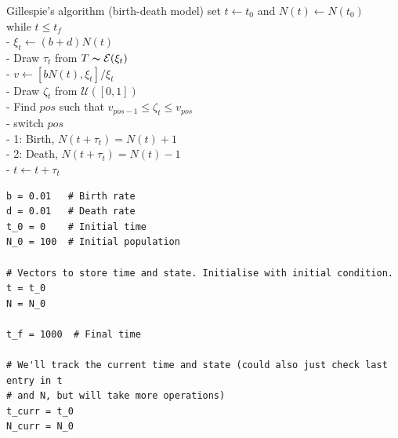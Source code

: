 \documentclass[aspectratio=169]{beamer}
\begin{document}
\begin{frame}{Gillespie's algorithm (birth-death model)}
set $t\leftarrow t_0$ and $N(t)\leftarrow N(t_0)$\\
while {$t\leq t_f$}\\
- $\xi_t\leftarrow (b+d)N(t)$\\
- Draw $\tau_t$ from $T\thicksim \mathcal{E}(\xi_t)$\\
- $v\leftarrow\left[bN(t),\xi_t\right]/\xi_t$\\
- Draw $\zeta_t$ from $\mathcal{U}([0,1])$\\
- Find $pos$ such that $v_{pos-1}\leq\zeta_t\leq v_{pos}$\\
- switch {$pos$}\\
\qquad - 1: Birth, $N(t+\tau_t)=N(t)+1$ \\
\qquad - 2: Death, $N(t+\tau_t)=N(t)-1$ \\
- $t\leftarrow t+\tau_t$    
\end{frame}

% 
% 
% 

\begin{frame}[fragile]
\begin{lstlisting}[language=Renhanced]
b = 0.01   # Birth rate
d = 0.01   # Death rate
t_0 = 0    # Initial time
N_0 = 100  # Initial population

# Vectors to store time and state. Initialise with initial condition.
t = t_0
N = N_0

t_f = 1000  # Final time

# We'll track the current time and state (could also just check last entry in t
# and N, but will take more operations)
t_curr = t_0
N_curr = N_0
\end{lstlisting}
\end{frame}
\end{document}
